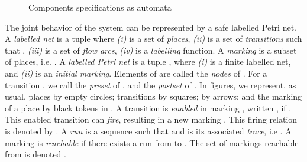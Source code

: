 \documentclass[a4paper]{article}
\begin{document}
\begin{figure}
{{ }} \hspace{4mm}
   \caption{Components specifications as automata}
   \label{fig:lts}
 \end{figure}

The joint behavior of the system can be represented by a safe labelled Petri net. A \emph{labelled net} is a tuple  where \emph{(i)}   is a set of \emph{places}, \emph{(ii)}   is a set of \emph{transitions} such that , \emph{(iii)}   is a set of \emph{flow arcs}, \emph{(iv)}  is a \emph{labelling} function. A \emph{marking} is a subset  of places, i.e. . A \emph{labelled Petri net} is a tuple , where \emph{(i)}  is a finite labelled net, and \emph{(ii)}  is an \emph{initial marking}. Elements of  are called the \emph{nodes} of . For a transition  , we call  the \emph{preset} of , and  the \emph{postset} of . In figures, we represent, as usual, places by empty circles; transitions by squares;  by arrows; and the marking of a place  by  black tokens in .  A transition  is \emph{enabled} in marking , written , if . This enabled transition can \emph{fire}, resulting in a new marking . This firing relation is denoted by . A \emph{run} is a sequence  such that  and  is its associated \emph{trace}, i.e . A marking  is \emph{reachable} if there exists a run from  to . The set of markings reachable from  is denoted . 
\end{document}
